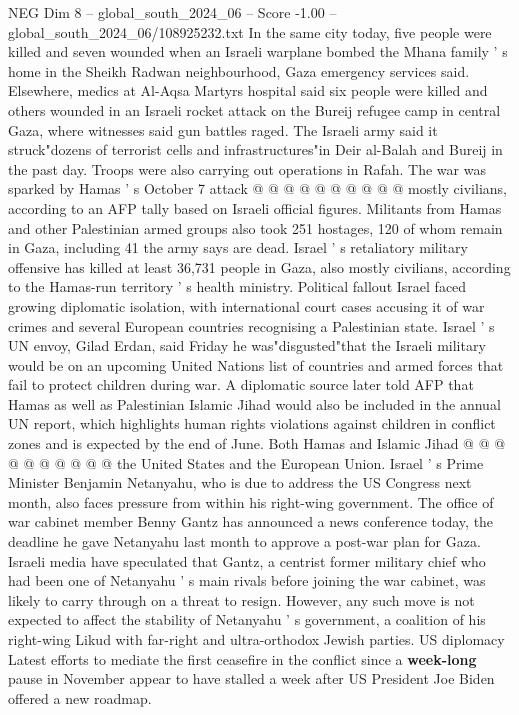 \begin{textsample}{NEG Dim 8 – global\_south\_2024\_06 – Score -1.00 – global\_south\_2024\_06/108925232.txt}
In the same city today, five people were killed and seven wounded when an Israeli warplane bombed the Mhana family ' s home in the Sheikh Radwan neighbourhood, Gaza emergency services said.
Elsewhere, medics at Al-Aqsa Martyrs hospital said six people were killed and others wounded in an Israeli rocket attack on the Bureij refugee camp in central Gaza, where witnesses said gun battles raged.
The Israeli army said it struck"dozens of terrorist cells and infrastructures"in Deir al-Balah and Bureij in the past day.
Troops were also carrying out operations in Rafah.
The war was sparked by Hamas ' s October 7 attack @ @ @ @ @ @ @ @ @ @ mostly civilians, according to an AFP tally based on Israeli official figures.
Militants from Hamas and other Palestinian armed groups also took 251 hostages, 120 of whom remain in Gaza, including 41 the army says are dead.
Israel ' s retaliatory military offensive has killed at least 36,731 people in Gaza, also mostly civilians, according to the Hamas-run territory ' s health ministry.
Political fallout Israel faced growing diplomatic isolation, with international court cases accusing it of war crimes and several European countries recognising a Palestinian state.
Israel ' s UN envoy, Gilad Erdan, said Friday he was"disgusted"that the Israeli military would be on an upcoming United Nations list of countries and armed forces that fail to protect children during war.
A diplomatic source later told AFP that Hamas as well as Palestinian Islamic Jihad would also be included in the annual UN report, which highlights human rights violations against children in conflict zones and is expected by the end of June.
Both Hamas and Islamic Jihad @ @ @ @ @ @ @ @ @ @ the United States and the European Union.
Israel ' s Prime Minister Benjamin Netanyahu, who is due to address the US Congress next month, also faces pressure from within his right-wing government.
The office of war cabinet member Benny Gantz has announced a news conference today, the deadline he gave Netanyahu last month to approve a post-war plan for Gaza.
Israeli media have speculated that Gantz, a centrist former military chief who had been one of Netanyahu ' s main rivals before joining the war cabinet, was likely to carry through on a threat to resign.
However, any such move is not expected to affect the stability of Netanyahu ' s government, a coalition of his right-wing Likud with far-right and ultra-orthodox Jewish parties.
US diplomacy Latest efforts to mediate the first ceasefire in the conflict since a \textbf{week-long} pause in November appear to have stalled a week after US President Joe Biden offered a new roadmap.

\end{textsample}
